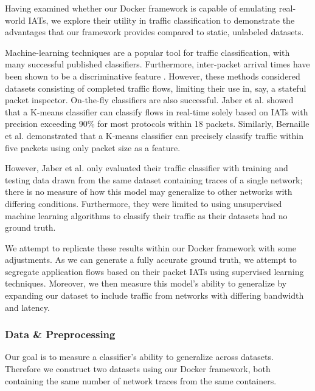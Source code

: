 \documentclass[sigconf]{acmart}
\begin{document}
Having examined whether our Docker framework is capable of emulating real-world IATs, we explore their utility in traffic classification to demonstrate the advantages that our framework provides compared to static, unlabeled datasets.

Machine-learning techniques are a popular tool for traffic classification, with many successful published classifiers. Furthermore, inter-packet arrival times have been shown to be a discriminative feature \cite{zander2005automated,nguyen2008survey}. However, these methods considered datasets consisting of completed traffic flows, limiting their use in, say, a stateful packet inspector. On-the-fly classifiers are also successful. Jaber et al. \cite{jaber2011can} showed that a K-means classifier can classify flows in real-time solely based on IATs with precision exceeding 90\% for most protocols within 18 packets. Similarly, Bernaille et al. \cite{bernaille2006traffic} demonstrated that a K-means classifier can precisely classify traffic within five packets using only packet size as a feature. 

 However, Jaber et al. \cite{jaber2011can} only evaluated their traffic classifier with training and testing data drawn from the same dataset containing traces of a single network; there is no measure of how this model may generalize to other networks with differing conditions. Furthermore, they were limited to using unsupervised machine learning algorithms to classify their traffic as their datasets had no ground truth. 

We attempt to replicate these results within our Docker framework with some adjustments. As we can generate a fully accurate ground truth, we attempt to segregate application flows based on their packet IATs using supervised learning techniques. Moreover, we then measure this model's ability to generalize by expanding our dataset to include traffic from networks with differing bandwidth and latency.

\subsubsection*{Data \& Preprocessing}

Our goal is to measure a classifier's ability to generalize across datasets. Therefore we construct two datasets using our Docker framework, both containing the same number of network traces from the same containers. 
\end{document}

